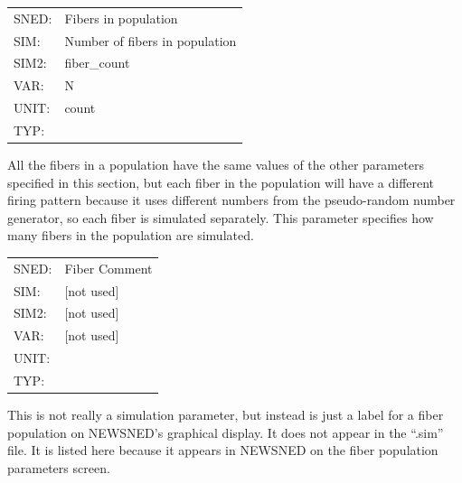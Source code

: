 \documentclass[12pt,openany,oneside]{book}
\begin{document}
\begin{flushleft}
\begin{tabular}{@{}ll@{}}
SNED: & Fibers in population\\
SIM: & Number of fibers in population\\
SIM2: & fiber\_count\\
VAR: & N\\
UNIT: & count\\
TYP: &\\
\end{tabular}
\end{flushleft}
\noindent
All the fibers in a population have the same values of the other
parameters specified in this section, but each fiber in the population
will have a different firing pattern because it uses different numbers
from the pseudo-random number generator, so each fiber is simulated
separately.  This parameter specifies how many fibers in the population
are simulated.
\filbreak
\vspace{\baselineskip}

\begin{flushleft}
\begin{tabular}{@{}ll@{}}
SNED: & Fiber Comment\\
SIM: & [not used]\\
SIM2: & [not used]\\
VAR: & [not used]\\
UNIT: &\\
TYP: &\\
\end{tabular}
\end{flushleft}
\noindent
This is not really a simulation parameter, but instead is just a label for a
fiber population on NEWSNED's graphical display.  It does not appear
in the ``.sim'' file.  It is listed here because it appears in NEWSNED
on the fiber population parameters screen.
\filbreak
\vspace{\baselineskip}
\end{document}
